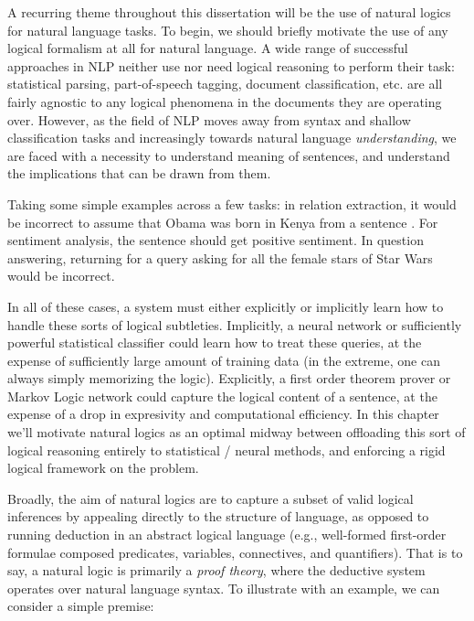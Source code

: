 A recurring theme throughout this dissertation will be the use of natural
  logics for natural language tasks.
%
%
To begin, we should briefly motivate the use of any logical formalism at all
  for natural language. %
A wide range of successful approaches in NLP neither use nor need logical reasoning 
  to perform their task:
  statistical parsing, part-of-speech tagging, document classification, etc. are all
  fairly agnostic to any logical phenomena in the documents they are operating over.
However, as the field of NLP moves away from syntax and shallow classification tasks and
  increasingly towards natural language \textit{understanding}, we are faced with a
  necessity to understand meaning of sentences, and understand the implications that can
  be drawn from them.

Taking some simple examples across a few tasks: in relation extraction, it would be
  incorrect to assume that Obama was born in Kenya from a sentence .
For sentiment analysis, the sentence  should get positive sentiment.
In question answering, returning  for a query asking for all the female
  stars of Star Wars would be incorrect.

In all of these cases, a system must either explicitly or implicitly learn how to handle these
  sorts of logical subtleties.
Implicitly, a neural network or sufficiently powerful statistical classifier could learn how
  to treat these queries, at the expense of sufficiently large amount of training data
  (in the extreme, one can always simply memorizing the logic).
Explicitly, a first order theorem prover or Markov Logic network could capture the logical
  content of a sentence, at the expense of a drop in expresivity and computational
  efficiency.
In this chapter we'll motivate natural logics as an optimal midway between offloading this sort
  of logical reasoning entirely to statistical / neural methods, and enforcing a rigid
  logical framework on the problem.


%
%
Broadly, the aim of natural logics are to capture a subset of valid logical
  inferences by appealing directly to the structure of language,
  as opposed to running deduction in an abstract logical language (e.g., well-formed first-order formulae
  composed predicates, variables, connectives, and quantifiers).
That is to say, a natural logic is primarily a \textit{proof theory}, where
  the deductive system operates over natural language syntax.
To illustrate with an example, we can consider a simple premise:

